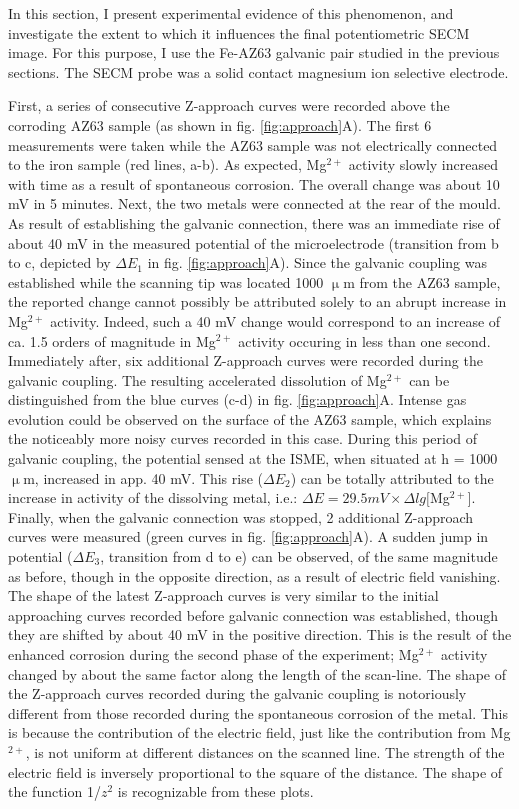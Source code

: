 In this section, I present experimental evidence of this phenomenon, and investigate the extent to which it influences the final potentiometric SECM image. For this purpose, I use the Fe-AZ63 galvanic pair studied in the previous sections. The SECM probe was a solid contact magnesium ion selective electrode.

First, a series of consecutive Z-approach curves were recorded above the corroding AZ63 sample (as shown in fig. \ref{fig:approach}A).
The first 6 measurements were taken while the AZ63 sample was not electrically connected to the iron sample (red lines, a-b). As expected, Mg$^{2+}$ activity slowly increased with time as a result of spontaneous corrosion. The overall change was about 10 mV in 5 minutes. Next, the two metals were connected at the rear of the mould. As result of establishing the galvanic connection, there was an immediate rise of about 40 mV in the measured potential of the microelectrode (transition from b to c, depicted by $\Delta E_1$ in fig. \ref{fig:approach}A). Since the galvanic coupling was established while the scanning tip was located 1000 $\upmu$m from the AZ63 sample, the reported change cannot possibly be attributed solely to an abrupt increase in Mg$^{2+}$ activity. Indeed, such a 40 mV change would correspond to an increase of ca. 1.5 orders of magnitude in Mg$^{2+}$ activity occuring in less than one second. Immediately after, six additional Z-approach curves were recorded during the galvanic coupling. The resulting accelerated dissolution of Mg$^{2+}$ can be distinguished from the blue curves (c-d) in fig. \ref{fig:approach}A. Intense gas evolution could be observed on the surface of the AZ63 sample, which explains the noticeably more noisy curves recorded in this case. During this period of galvanic coupling, the potential sensed at the ISME, when situated at h = 1000 $\upmu$m, increased in app. 40 mV. This rise ($\Delta E_2$) can be totally attributed to the increase in activity of the dissolving metal, i.e.: $\Delta E = 29.5 mV \times \Delta lg[$Mg$^{2+}]$. Finally, when the galvanic connection was stopped, 2 additional Z-approach curves were measured (green curves in fig. \ref{fig:approach}A). A sudden jump in potential ($\Delta E_3$, transition from d to e) can be observed, of the same magnitude as before, though in the opposite direction, as a result of electric field vanishing. The shape of the latest Z-approach curves is very similar to the initial approaching curves recorded before galvanic connection was established, though they are shifted by about 40 mV in the positive direction. This is the result of the enhanced corrosion during the second phase of the experiment; Mg$^{2+}$ activity changed by about the same factor along the length of the scan-line. The shape of the Z-approach curves recorded during the galvanic coupling is notoriously different from those recorded during the spontaneous corrosion of the metal. This is because the contribution of the electric field, just like the contribution from Mg$^{2+}$, is not uniform at different distances on the scanned line. The strength of the electric field is inversely proportional to the square of the distance. The shape of the function 1/$z^2$ is recognizable from these plots.

